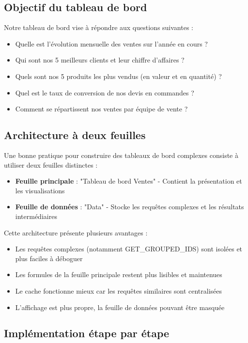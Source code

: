 \documentclass[12pt, a4paper]{article}
\begin{document}
\subsection{Objectif du tableau de bord}

Notre tableau de bord vise à répondre aux questions suivantes :
\begin{itemize}
    \item Quelle est l'évolution mensuelle des ventes sur l'année en cours ?
    \item Qui sont nos 5 meilleurs clients et leur chiffre d'affaires ?
    \item Quels sont nos 5 produits les plus vendus (en valeur et en quantité) ?
    \item Quel est le taux de conversion de nos devis en commandes ?
    \item Comment se répartissent nos ventes par équipe de vente ?
\end{itemize}

\subsection{Architecture à deux feuilles}

Une bonne pratique pour construire des tableaux de bord complexes consiste à utiliser deux feuilles distinctes :

\begin{itemize}
    \item \textbf{Feuille principale} : "Tableau de bord Ventes" - Contient la présentation et les visualisations
    \item \textbf{Feuille de données} : "Data" - Stocke les requêtes complexes et les résultats intermédiaires
\end{itemize}

Cette architecture présente plusieurs avantages :
\begin{itemize}
    \item Les requêtes complexes (notamment GET\_GROUPED\_IDS) sont isolées et plus faciles à déboguer
    \item Les formules de la feuille principale restent plus lisibles et maintenues
    \item Le cache fonctionne mieux car les requêtes similaires sont centralisées
    \item L'affichage est plus propre, la feuille de données pouvant être masquée
\end{itemize}

\subsection{Implémentation étape par étape}
\end{document}

